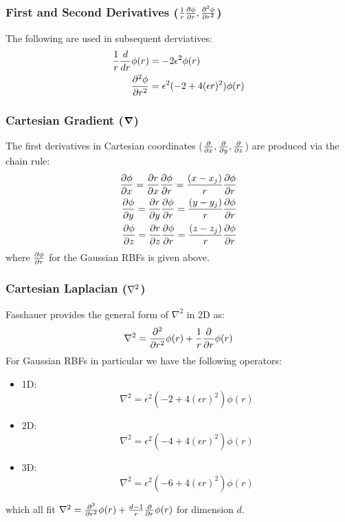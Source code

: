 \documentclass[11pt]{report}
\begin{document}
{\subsubsection{First and Second Derivatives ($\frac{1}{r}\frac{\partial \phi}{\partial r}, \frac{\partial^2 \phi}{\partial r^2}$)}
The following are used in subsequent derviatives:
\begin{align*}
\frac{1}{r}\frac{d }{d r}\phi(r) & = -2 \epsilon^2 \phi(r) \\
\frac{\partial^2 \phi}{\partial r^2} & = \epsilon^2(-2 + 4(\epsilon r)^2)\phi(r)
\end{align*}



\subsubsection{Cartesian Gradient ($\grad$)}
The first derivatives in Cartesian coordinates ($\frac{\partial }{\partial x}, \frac{\partial }{\partial y}, \frac{\partial }{\partial z}$) are produced via the chain rule:
	\begin{align*} 
	 \frac{\partial \phi}{\partial x} = \frac{\partial r}{\partial x} \frac{\partial \phi}{\partial r} = \frac{(x-x_{j})}{r} \frac{\partial \phi}{\partial r} \\
	 \frac{\partial \phi}{\partial y} = \frac{\partial r}{\partial y} \frac{\partial \phi}{\partial r} = \frac{(y-y_{j})}{r} \frac{\partial \phi}{\partial r} \\
	 \frac{\partial \phi}{\partial z} = \frac{\partial r}{\partial z} \frac{\partial \phi}{\partial r} = \frac{(z-z_{j})}{r} \frac{\partial \phi}{\partial r}
	\end{align*}
where $\frac{\partial \phi}{\partial r}$ for the Gaussian RBFs is given above. 


\subsubsection{Cartesian Laplacian ($\Laplacian$)}
Fasshauer \cite{Fasshauer2007} provides the general form of $\nabla^2$ in 2D as: 
\begin{align*}
\nabla^2 = \frac{\partial^2 }{\partial r^2}\phi(r) + \frac{1}{r}\frac{\partial }{\partial r} \phi(r) 
\end{align*}
For Gaussian RBFs in particular we have the following operators:
\begin{itemize}
\item 1D: $$\nabla^2 = \epsilon^2 (-2 + 4 (\epsilon r)^2) \phi(r)$$
\item 2D: $$\nabla^2 = \epsilon^2 (-4 + 4 (\epsilon r)^2) \phi(r)$$
\item 3D: $$\nabla^2 = \epsilon^2 (-6 + 4 (\epsilon r)^2) \phi(r)$$
\end{itemize}
which all fit $\nabla^2 = \frac{\partial^2 }{\partial r^2}\phi(r) + \frac{d - 1}{r}\frac{\partial }{\partial r} \phi(r)$ for dimension $d$.

}
\end{document}
